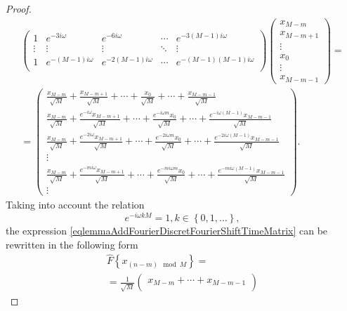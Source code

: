 \begin{proof}
\begin{eqnarray}
\begin{pmatrix}
1 & e^{-3 i \omega} & e^{-6 i \omega} & \cdots & 
e^{-3 \left( M - 1 \right) i \omega} \\
\vdots & \vdots & \vdots & \ddots & \vdots \\
1 & e^{-\left( M - 1 \right) i \omega} & e^{-2\left( M - 1 \right) i \omega} & \cdots & 
e^{- \left( M - 1 \right)\left( M - 1 \right) i \omega} \\
\end{pmatrix}
\begin{pmatrix}
x_{M - m} \\
x_{M - m + 1}\\ 
\vdots \\
x_0 \\
\vdots \\
x_{M - m - 1}
\end{pmatrix} = 
\nonumber \\
= 
\begin{pmatrix}
\frac{x_{M - m}}{\sqrt{M}} + \frac{x_{M - m + 1}}{\sqrt{M}} + \cdots + 
\frac{x_0}{\sqrt{M}} + \cdots + \frac{x_{M - m - 1}}{\sqrt{M}}\\
\frac{x_{M - m}}{\sqrt{M}} + 
\frac{e^{-i \omega} x_{M - m + 1}}{\sqrt{M}} + 
\cdots + 
\frac{e^{-i \omega m  } x_0}{\sqrt{M}} + 
\cdots +
\frac{e^{-i \omega \left( M - 1 \right) } x_{M - m - 1}}{\sqrt{M}}\\ 
\frac{x_{M - m}}{\sqrt{M}} + 
\frac{e^{-2 i \omega} x_{M - m + 1}}{\sqrt{M}} + 
\cdots + 
\frac{e^{-2 i \omega m  } x_0}{\sqrt{M}} + 
\cdots +
\frac{e^{-2 i \omega \left( M - 1 \right) } x_{M - m - 1}}{\sqrt{M}}\\ 
\vdots \\
\frac{x_{M - m}}{\sqrt{M}} + 
\frac{e^{-m i \omega} x_{M - m + 1}}{\sqrt{M}} + 
\cdots + 
\frac{e^{-m i \omega m  } x_0}{\sqrt{M}} + 
\cdots +
\frac{e^{-m i \omega \left( M - 1 \right) } x_{M - m - 1}}{\sqrt{M}}\\ 
\vdots 
\end{pmatrix}.
\label{eqlemmaAddFourierDiscretFourierShiftTimeMatrix}
\end{eqnarray}
Taking into account the relation
\[
e^{-i \omega k M} = 1, k \in \left\{0, 1, \dots \right\},
\]
the expression
\eqref{eqlemmaAddFourierDiscretFourierShiftTimeMatrix} can
be rewritten in the following form
\begin{eqnarray}
\hat{F}\left\{x_{\left(n - m\right) \mod M}\right\} = 
\nonumber \\
=
\frac{1}{\sqrt{M}}
\begin{pmatrix}
x_{M - m} + \cdots +
x_{M - m - 1}\\

\end{pmatrix}
\end{eqnarray}
\end{proof}
